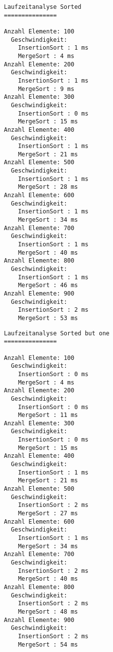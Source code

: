 \documentclass[12pt]{article}
\begin{document}
\newpage
\begin{verbatim}
Laufzeitanalyse Sorted
===============
 
Anzahl Elemente: 100
  Geschwindigkeit:
    InsertionSort : 1 ms
    MergeSort : 4 ms
Anzahl Elemente: 200
  Geschwindigkeit:
    InsertionSort : 1 ms
    MergeSort : 9 ms
Anzahl Elemente: 300
  Geschwindigkeit:
    InsertionSort : 0 ms
    MergeSort : 15 ms
Anzahl Elemente: 400
  Geschwindigkeit:
    InsertionSort : 1 ms
    MergeSort : 21 ms
Anzahl Elemente: 500
  Geschwindigkeit:
    InsertionSort : 1 ms
    MergeSort : 28 ms
Anzahl Elemente: 600
  Geschwindigkeit:
    InsertionSort : 1 ms
    MergeSort : 34 ms
Anzahl Elemente: 700
  Geschwindigkeit:
    InsertionSort : 1 ms
    MergeSort : 40 ms
Anzahl Elemente: 800
  Geschwindigkeit:
    InsertionSort : 1 ms
    MergeSort : 46 ms
Anzahl Elemente: 900
  Geschwindigkeit:
    InsertionSort : 2 ms
    MergeSort : 53 ms
\end{verbatim}

\newpage
\begin{verbatim}
Laufzeitanalyse Sorted but one
===============
 
Anzahl Elemente: 100
  Geschwindigkeit:
    InsertionSort : 0 ms
    MergeSort : 4 ms
Anzahl Elemente: 200
  Geschwindigkeit:
    InsertionSort : 0 ms
    MergeSort : 11 ms
Anzahl Elemente: 300
  Geschwindigkeit:
    InsertionSort : 0 ms
    MergeSort : 15 ms
Anzahl Elemente: 400
  Geschwindigkeit:
    InsertionSort : 1 ms
    MergeSort : 21 ms
Anzahl Elemente: 500
  Geschwindigkeit:
    InsertionSort : 2 ms
    MergeSort : 27 ms
Anzahl Elemente: 600
  Geschwindigkeit:
    InsertionSort : 1 ms
    MergeSort : 34 ms
Anzahl Elemente: 700
  Geschwindigkeit:
    InsertionSort : 2 ms
    MergeSort : 40 ms
Anzahl Elemente: 800
  Geschwindigkeit:
    InsertionSort : 2 ms
    MergeSort : 48 ms
Anzahl Elemente: 900
  Geschwindigkeit:
    InsertionSort : 2 ms
    MergeSort : 54 ms
\end{verbatim}
\end{document}
